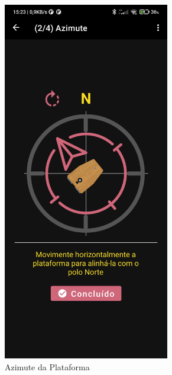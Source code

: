 \begin{figure}[!htb]
\begin{subfigure}[b]{0.3\textwidth}
		\includegraphics[width=0.8\textwidth]{figuras/desAplicativo/azimute}
		\caption{Azimute da Plataforma}
		\label{azimuteplataforma}
	\end{subfigure}
	\hfill
	\begin{subfigure}[b]{0.3\textwidth}
		\centering

\end{subfigure}
\end{figure}
